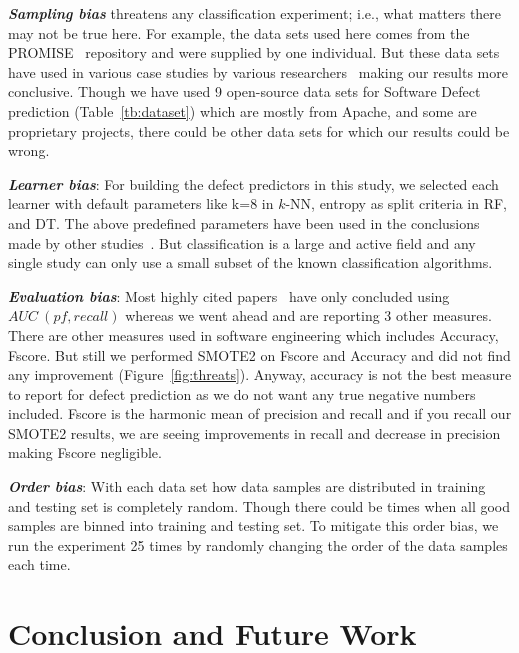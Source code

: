 \documentclass[sigconf,review, anonymous]{acmart}
\theoremstyle{break}
\theoremstyle{break}
\begin{document}
\textbf{\textit{Sampling bias}} threatens any classification experiment; i.e., what matters there may not be true here. For example, the data sets used here comes from the PROMISE~\cite{promiserepo} repository and were supplied by one individual. But these data sets have used in various case studies by various researchers~\cite{he2012investigation,peters2013better,peters2013balancing,turhan2013empirical} making our results more conclusive.
Though we have used 9 open-source data sets for Software Defect prediction (Table~\ref{tb:dataset}) which are mostly from Apache, and some are proprietary projects, there could be other data sets for which our results could be wrong.

\textbf{\textit{Learner bias}}: For building the defect predictors in this
study, we selected each learner with default parameters like k=8 in $k$-NN, entropy as split criteria in RF, and DT. The above predefined parameters have been used in the conclusions made by other studies~\cite{ghotra2015revisiting,tantithamthavorn2016automated}. But classification is a large and active field and any single study can only use a small subset of the known classification algorithms.

\textbf{\textit{Evaluation bias}}: Most highly cited papers~\cite{ghotra2015revisiting,tantithamthavorn2016automated} have only concluded using $AUC\ (pf, recall)$ whereas we went ahead and are reporting 3 other measures. There are other measures used in software engineering which includes Accuracy, Fscore. But still we performed SMOTE2 on Fscore and Accuracy and did not find any improvement (Figure~\ref{fig:threats}). Anyway, accuracy is not the best measure to report for defect prediction as we do not want any true negative numbers included. Fscore is the harmonic mean of precision and recall and if you recall our SMOTE2 results, we are seeing  improvements in recall and  decrease in precision making Fscore negligible.

\textbf{\textit{Order bias}}: With each data set how data samples are distributed in training and testing set is completely random. Though there could be times when all good samples are binned into training and testing set. To mitigate this order bias, we run
the experiment 25 times by randomly changing the order of the data samples each time.

\section{Conclusion and Future Work}
\label{sect:conclusion}
\end{document}
